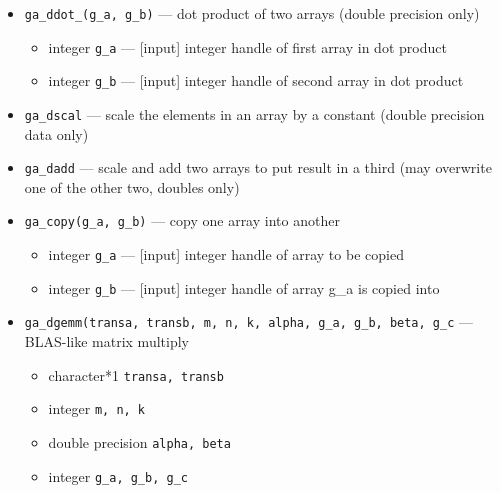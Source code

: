 \begin{itemize}
\item {\tt ga\_ddot\_(g\_a, g\_b)} --- dot product of two arrays (double precision only)
\begin{itemize}
\item     integer {\tt g\_a}         --- [input] integer handle of first array in dot product
\item     integer {\tt g\_b}         --- [input] integer handle of second array in dot product
\end{itemize}

\item {\tt ga\_dscal} --- scale the elements in an array by a constant
  (double precision data only)
\item {\tt ga\_dadd} --- scale and add two arrays to put result in a
  third (may overwrite one of the other two, doubles only)
\item {\tt ga\_copy(g\_a, g\_b)} --- copy one array into another
\begin{itemize}
\item     integer {\tt g\_a}          --- [input] integer handle of array to be copied
\item     integer {\tt g\_b}         --- [input] integer handle of array g\_a is copied into
\end{itemize}

\item {\tt ga\_dgemm(transa, transb, m, n, k, alpha, g\_a, g\_b, beta, g\_c} --- 
BLAS-like matrix multiply
\begin{itemize}
\item      character*1        {\tt transa, transb}
\item      integer            {\tt m, n, k}
\item      double precision   {\tt alpha, beta}
\item      integer            {\tt g\_a, g\_b, g\_c}
\end{itemize}


\end{itemize}
